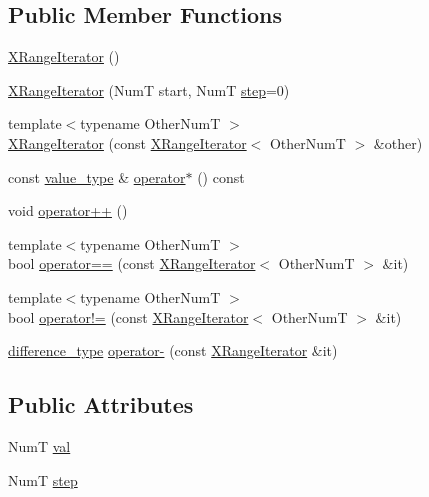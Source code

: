 \subsection*{Public Member Functions}
\begin{DoxyCompactItemize}
\item 
\hyperlink{classseq_1_1math_1_1_x_range_iterator_ab5a22866a4f442205cfd48706abfccae}{X\-Range\-Iterator} ()
\item 
\hyperlink{classseq_1_1math_1_1_x_range_iterator_a816bede24a264db47024b9d4d68e071e}{X\-Range\-Iterator} (Num\-T start, Num\-T \hyperlink{classseq_1_1math_1_1_x_range_iterator_a73d7e94422117d0f2eff60edb9cb4273}{step}=0)
\item 
{\footnotesize template$<$typename Other\-Num\-T $>$ }\\\hyperlink{classseq_1_1math_1_1_x_range_iterator_a9c5e86abe5f22bd6948199ca45903072}{X\-Range\-Iterator} (const \hyperlink{classseq_1_1math_1_1_x_range_iterator}{X\-Range\-Iterator}$<$ Other\-Num\-T $>$ \&other)
\item 
const \hyperlink{classseq_1_1math_1_1_x_range_iterator_a18b93b3a4ea6128dedb3668b35814bf0}{value\-\_\-type} \& \hyperlink{classseq_1_1math_1_1_x_range_iterator_a1d2dd554ef5b57918368118e40f0d5b5}{operator$\ast$} () const 
\item 
void \hyperlink{classseq_1_1math_1_1_x_range_iterator_a1300df3f2e7804d5222f0dc33e9cb882}{operator++} ()
\item 
{\footnotesize template$<$typename Other\-Num\-T $>$ }\\bool \hyperlink{classseq_1_1math_1_1_x_range_iterator_abc9809b474c95cf6084e653fc6e0f949}{operator==} (const \hyperlink{classseq_1_1math_1_1_x_range_iterator}{X\-Range\-Iterator}$<$ Other\-Num\-T $>$ \&it)
\item 
{\footnotesize template$<$typename Other\-Num\-T $>$ }\\bool \hyperlink{classseq_1_1math_1_1_x_range_iterator_a883f1df0c26af59f698f27baec0e9ce4}{operator!=} (const \hyperlink{classseq_1_1math_1_1_x_range_iterator}{X\-Range\-Iterator}$<$ Other\-Num\-T $>$ \&it)
\item 
\hyperlink{classseq_1_1math_1_1_x_range_iterator_aff997a44dcd04a95ae2e0255d9cdaf43}{difference\-\_\-type} \hyperlink{classseq_1_1math_1_1_x_range_iterator_af564e5e69dfa23d36c1258db91c91610}{operator-\/} (const \hyperlink{classseq_1_1math_1_1_x_range_iterator}{X\-Range\-Iterator} \&it)
\end{DoxyCompactItemize}
\subsection*{Public Attributes}
\begin{DoxyCompactItemize}
\item 
Num\-T \hyperlink{classseq_1_1math_1_1_x_range_iterator_aab232a017c574d7190828cc2633aad4a}{val}
\item 
Num\-T \hyperlink{classseq_1_1math_1_1_x_range_iterator_a73d7e94422117d0f2eff60edb9cb4273}{step}
\end{DoxyCompactItemize}


